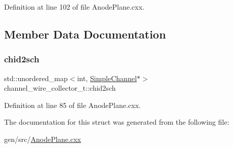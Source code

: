 Definition at line 102 of file Anode\+Plane.\+cxx.



\subsection{Member Data Documentation}
\mbox{\label{structchannel__wire__collector__t_a4f9a724ec5130b2e77444c63723caf08}} 
\subsubsection{\texorpdfstring{chid2sch}{chid2sch}}
{\footnotesize\ttfamily std\+::unordered\+\_\+map$<$int, \hyperlink{class_wire_cell_1_1_simple_channel}{Simple\+Channel}$\ast$$>$ channel\+\_\+wire\+\_\+collector\+\_\+t\+::chid2sch}



Definition at line 85 of file Anode\+Plane.\+cxx.



The documentation for this struct was generated from the following file\+:\begin{DoxyCompactItemize}
\item 
gen/src/\hyperlink{_anode_plane_8cxx}{Anode\+Plane.\+cxx}\end{DoxyCompactItemize}
